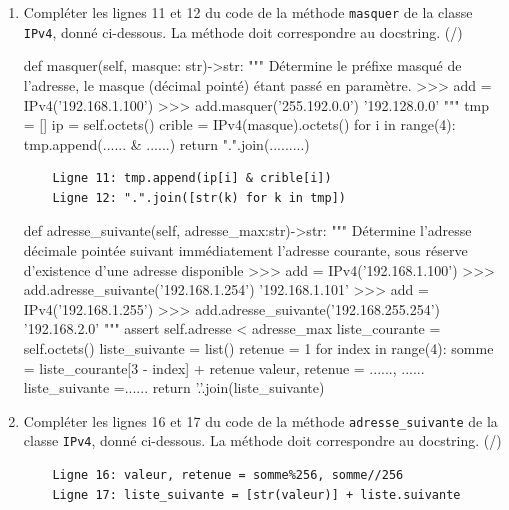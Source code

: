    \begin{enumerate}[resume=monDS]
    \item Compléter les lignes 11 et 12 du code de la méthode \verb|masquer| de la classe \verb|IPv4|, donné ci-dessous. La méthode doit correspondre au docstring. (/)
    
\begin{CodePythontexAlt}[TaillePolice=\large, Largeur=1\linewidth,Centre,Lignes=true,PremLigne=1]{}
    def masquer(self, masque: str)->str:
        """ Détermine le préfixe masqué de l'adresse, 
        le masque (décimal pointé) étant passé en paramètre. 
        >>> add = IPv4('192.168.1.100')
        >>> add.masquer('255.192.0.0')
        '192.128.0.0'        """
        tmp = []
        ip = self.octets()
        crible = IPv4(masque).octets()
        for i in range(4):
            tmp.append(...... & ......)
        return ".".join(.........)
   \end{CodePythontexAlt}

   \begin{blocvisible}[height=1.5]
        \begin{lstlisting}
    Ligne 11: tmp.append(ip[i] & crible[i])
    Ligne 12: ".".join([str(k) for k in tmp])        
    \end{lstlisting}
    \end{blocvisible}


        \begin{CodePythontexAlt}[TaillePolice=\large, Largeur=1\linewidth,Centre,Lignes=true,PremLigne=1]{}
    def adresse_suivante(self, adresse_max:str)->str:
        """ Détermine l'adresse décimale pointée suivant immédiatement 
        l'adresse courante, sous réserve d'existence d'une adresse disponible 
        >>> add = IPv4('192.168.1.100')
        >>> add.adresse_suivante('192.168.1.254')
        '192.168.1.101'
        >>> add = IPv4('192.168.1.255')
        >>> add.adresse_suivante('192.168.255.254')
        '192.168.2.0'        """
        assert self.adresse < adresse_max
        liste_courante = self.octets()
        liste_suivante = list()
        retenue = 1
        for index in range(4):
            somme = liste_courante[3 - index] + retenue
            valeur, retenue = ......, ......
            liste_suivante =......
        return '.'.join(liste_suivante)
   \end{CodePythontexAlt}
        
    

   \medskip

\item Compléter les lignes 16 et 17 du code de la méthode \verb|adresse_suivante| de la classe \verb|IPv4|, donné ci-dessous. La méthode doit correspondre au docstring. (/)

  \begin{blocvisible}[height=1.5]
        \begin{lstlisting}
    Ligne 16: valeur, retenue = somme%256, somme//256
    Ligne 17: liste_suivante = [str(valeur)] + liste.suivante     
    \end{lstlisting}
    \end{blocvisible}


   \end{enumerate}
